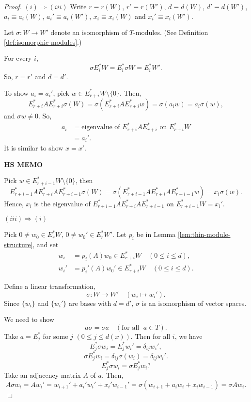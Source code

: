 \documentclass[
]{book}
\theoremstyle{definition}
\theoremstyle{definition}
\theoremstyle{definition}
\theoremstyle{definition}
\theoremstyle{remark}
\begin{document}
\begin{proof}
\((i)\Rightarrow (iii)\)
Write \(r\equiv r(W)\), \(r' \equiv r(W')\), \(d \equiv d(W)\), \(d' \equiv d(W')\), \(a_i \equiv a_i(W)\), \(a_i' \equiv a_i(W')\), \(x_i \equiv x_i(W)\) and \(x_i' \equiv x_i(W')\).

Let \(\sigma: W\to W'\) denote an isomorphism of \(T\)-modules. (See Definition \ref{def:isomorphic-modules}.)

For every \(i\),
\[\sigma E^*_iW = E^*_i\sigma W = E^*_iW'.\]
So, \(r = r'\) and \(d = d'\).

To show \(a_i = a_i'\), pick \(w\in E^*_{r+i}W \setminus \{0\}\). Then,
\[E^*_{r+i}AE^*_{r+i}\sigma (W) = \sigma(E^*_{r+i}AE^*_{r+i}w) = \sigma(a_iw) = a_i\sigma(w), \]
and \(\sigma w\neq 0\). So,
\begin{align}
a_i & = \text{eigenvalue of $E^*_{r+i}AE^*_{r+i}$ on $E^*_{r+i}W$}\\
& = a_i'.
\end{align}
It is similar to show \(x = x'\).

\textbf{HS MEMO}

Pick \(w\in E^*_{r+i-1}W \setminus \{0\}\), then
\[E^*_{r+i-1}AE^*_{r+i}AE^*_{r+i-1}\sigma(W) = \sigma(E^*_{r+i-1}AE^*_{r+i}AE^*_{r+i-1}w) = x_i\sigma(w).\]
Hence, \(x_i\) is the eigenvalue of \(E^*_{r+i-1}AE^*_{r+i}AE^*_{r+i-1}\) on \(E^*_{r+i-1}W = x_i'\).

\((iii)\Rightarrow (i)\)

Pick \(0\neq w_0\in E^*_rW\), \(0\neq w_0'\in E^*_rW'\). Let \(p_i\) be in Lemma \ref{lem:thin-module-structure}, and set
\begin{align}
w_i & = p_i(A)w_0\in E^*_{r+i}W \quad (0\leq i\leq d), \\
w_i' & = p_i'(A)w_0' \in E^*_{r+i}W \quad (0\leq i\leq d).
\end{align}

Define a linear transformation,
\[\sigma: W \to W' \quad (w_i \mapsto w_i').\]
Since \(\{w_i\}\) and \(\{w_i'\}\) are bases with \(d = d'\), \(\sigma\) is an isomorphism of vector spaces.

We need to show
\[a\sigma = \sigma a \quad (\text{for all }\; a\in T).\]
Take \(a = E^*_j\) for some \(j\) \((0\leq j\leq d(x))\). Then for all \(i\), we have
\[E^*_j \sigma w_i = E^*_jw_i' = \delta_{ij}w_i',\]
\[\sigma E^*_jw_i = \delta_{ij}\sigma(w_i) = \delta_{ij}w_i'.\]
\[E^*_j \sigma w_i = \sigma E^*_jw_i?\]
Take an adjacency matrix \(A\) of \(a\). Then,
\[A\sigma w_i = Aw_i' = w_{i+1}' + a_i'w_i' + x_i'w_{i-1}' = \sigma(w_{i+1} + a_iw_i + x_iw_{i-1}) = \sigma Aw_i.\]


\end{proof}
\end{document}
